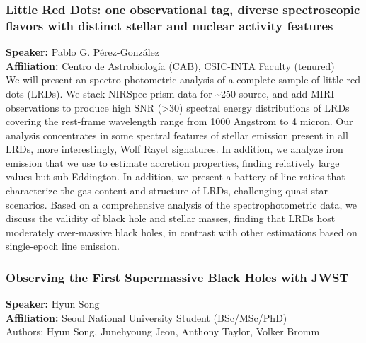 \subsubsection*{Little Red Dots: one observational tag, diverse spectroscopic flavors with distinct stellar and nuclear activity features}
\textbf{Speaker:} Pablo G. Pérez-González \\
\textbf{Affiliation:} Centro de Astrobiología (CAB), CSIC-INTA \textperiodcentered{} Faculty (tenured)\\
We will present an spectro-photometric analysis of a complete sample of little red dots (LRDs). We stack NIRSpec prism data for \textasciitilde{}250 source, and add MIRI observations to produce high SNR (>30) spectral energy distributions of LRDs covering the rest-frame wavelength range from 1000 Angstrom to 4 micron. Our analysis concentrates in some spectral features of stellar emission present in all LRDs, more interestingly, Wolf Rayet signatures. In addition, we analyze iron emission that we use to estimate accretion properties, finding relatively large values but sub-Eddington. In addition, we present a battery of line ratios that characterize the gas content and structure of LRDs, challenging quasi-star scenarios. Based on a comprehensive analysis of the spectrophotometric data, we discuss the validity of black hole and stellar masses, finding that LRDs host moderately over-massive black holes, in contrast with other estimations based on single-epoch line emission.

\hypertarget{abs-64}{}
\subsubsection*{Observing the First Supermassive Black Holes with JWST}
\textbf{Speaker:} Hyun Song \\
\textbf{Affiliation:} Seoul National University \textperiodcentered{} Student (BSc/MSc/PhD)\\
Authors: Hyun Song, Junehyoung Jeon, Anthony Taylor, Volker Bromm

